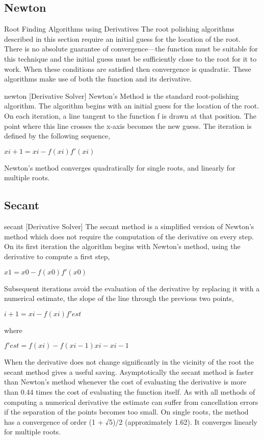 \subsection{Newton}
Root Finding Algorithms using Derivatives
The root polishing algorithms described in this section require an initial guess for the
location of the root. There is no absolute guarantee of convergence—the function must be
suitable for this technique and the initial guess must be sufficiently close to the root for it
to work. When these conditions are satisfied then convergence is quadratic.
These algorithms make use of both the function and its derivative.

newton [Derivative Solver]
Newton’s Method is the standard root-polishing algorithm. The algorithm begins
with an initial guess for the location of the root. On each iteration, a line tangent to
the function f is drawn at that position. The point where this line crosses the x-axis
becomes the new guess. The iteration is defined by the following sequence,

$xi+1 = xi − f(xi) f′(xi)$

Newton’s method converges quadratically for single roots, and linearly for multiple
roots.


\subsection{Secant}
secant [Derivative Solver]
The secant method is a simplified version of Newton’s method which does not require
the computation of the derivative on every step.
On its first iteration the algorithm begins with Newton’s method, using the derivative
to compute a first step,

$x1 = x0 − f(x0) f′(x0)$

Subsequent iterations avoid the evaluation of the derivative by replacing it with a
numerical estimate, the slope of the line through the previous two points,

$i+1 = xi − f(xi) f′ est$

where 

$f′est =f(xi) − f(xi−1)xi − xi−1$

When the derivative does not change significantly in the vicinity of the root the
secant method gives a useful saving. Asymptotically the secant method is faster than
Newton’s method whenever the cost of evaluating the derivative is more than 0.44
times the cost of evaluating the function itself. As with all methods of computing a
numerical derivative the estimate can suffer from cancellation errors if the separation
of the points becomes too small.
On single roots, the method has a convergence of order (1 + √5)/2 (approximately
1.62). It converges linearly for multiple roots.




